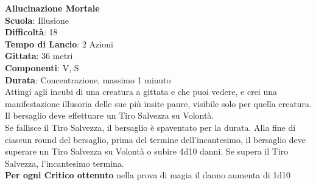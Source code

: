 \begin{multicols}{2}
\medskip\textbf{Allucinazione Mortale}\\
\textbf{Scuola}: Illusione\\
\textbf{Difficoltà}:  18\\
\textbf{Tempo di Lancio}: 2 Azioni\\
\textbf{Gittata}: 36 metri\\
\textbf{Componenti}: V, S\\
\textbf{Durata}: Concentrazione, massimo 1 minuto\\
Attingi agli incubi di una creatura a gittata e che puoi vedere, e crei una manifestazione illusoria delle sue più insite paure, visibile solo per quella creatura. Il bersaglio deve effettuare un Tiro Salvezza su Volontà.\\
Se fallisce il Tiro Salvezza, il bersaglio è spaventato per la durata. Alla fine di ciascun round del bersaglio, prima del termine dell'incantesimo, il bersaglio deve superare un Tiro Salvezza su Volontà o subire 4d10 danni. Se supera il Tiro Salvezza, l'incantesimo termina.\\
\textbf{Per ogni Critico ottenuto} nella prova di magia il danno aumenta di 1d10


\end{multicols}
